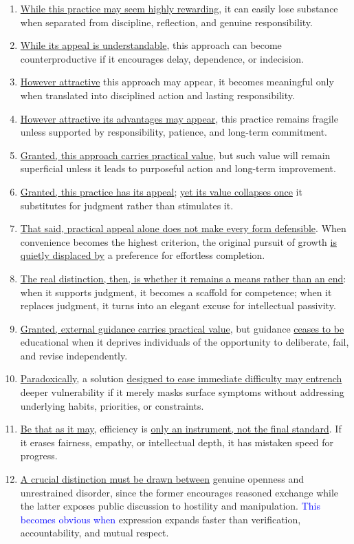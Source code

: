 \begin{enumerate}
    \item \underline{While this practice may seem highly rewarding}, it can easily lose substance when separated from discipline, reflection, and genuine responsibility.
    \item \underline{While its appeal is understandable}, this approach can become counterproductive if it encourages delay, dependence, or indecision.
    \item \underline{However attractive} this approach may appear, it becomes meaningful only when translated into disciplined action and lasting responsibility.
    \item \underline{However attractive its advantages may appear}, this practice remains fragile unless supported by responsibility, patience, and long-term commitment.
    \item  \underline{Granted, this approach carries practical value}, but such value will remain superficial unless it leads to purposeful action and long-term improvement.
    \item \underline{Granted, this practice has its appeal}; \underline{yet its value collapses once} it substitutes for judgment rather than stimulates it.
    \item \underline{That said, practical appeal alone does not make every form defensible}. When convenience becomes the highest criterion, the original pursuit of growth \underline{is quietly displaced by} a preference for effortless completion.
    \item \underline{The real distinction, then, is whether it remains a means rather than an end}: when it supports judgment, it becomes a scaffold for competence; when it replaces judgment, it turns into an elegant excuse for intellectual passivity.
    \item \underline{Granted, external guidance carries practical value}, but guidance \underline{ceases to be} educational when it deprives individuals of the opportunity to deliberate, fail, and revise independently.
    \item \underline{Paradoxically}, a solution \underline{designed to ease immediate difficulty may entrench} deeper vulnerability if it merely masks surface symptoms without addressing underlying habits, priorities, or constraints.
    \item \underline{Be that as it may}, efficiency is \underline{only an instrument, not the final standard}. If it erases fairness, empathy, or intellectual depth, it has mistaken speed for progress.
    \item \underline{A crucial distinction must be drawn between} genuine openness and unrestrained disorder, since the former encourages reasoned exchange while the latter exposes public discussion to hostility and manipulation. \textcolor{blue}{This becomes obvious when} expression expands faster than verification, accountability, and mutual respect.

\end{enumerate}

